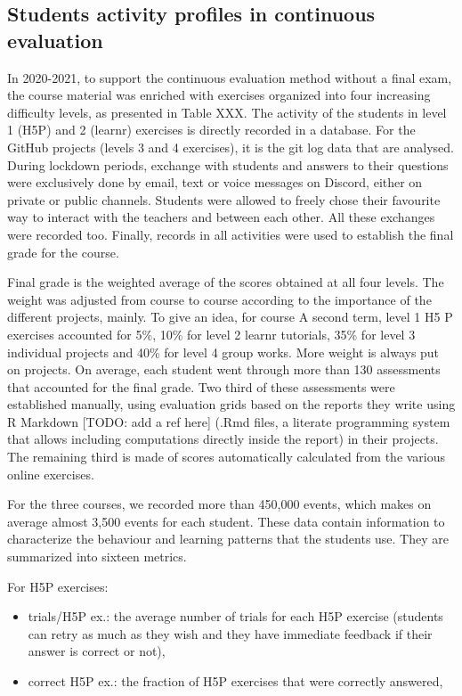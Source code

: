\documentclass[
]{article}
\providecommand{\tightlist}{%
  \setlength{\itemsep}{0pt}\setlength{\parskip}{0pt}}
\begin{document}
\hypertarget{students-activity-profiles-in-continuous-evaluation}{%
\subsection{Students activity profiles in continuous
evaluation}\label{students-activity-profiles-in-continuous-evaluation}}

In 2020-2021, to support the continuous evaluation method without a
final exam, the course material was enriched with exercises organized
into four increasing difficulty levels, as presented in Table XXX. The
activity of the students in level 1 (H5P) and 2 (learnr) exercises is
directly recorded in a database. For the GitHub projects (levels 3 and 4
exercises), it is the git log data that are analysed. During lockdown
periods, exchange with students and answers to their questions were
exclusively done by email, text or voice messages on Discord, either on
private or public channels. Students were allowed to freely chose their
favourite way to interact with the teachers and between each other. All
these exchanges were recorded too. Finally, records in all activities
were used to establish the final grade for the course.

Final grade is the weighted average of the scores obtained at all four
levels. The weight was adjusted from course to course according to the
importance of the different projects, mainly. To give an idea, for
course A second term, level 1 H5 P exercises accounted for 5\%, 10\% for
level 2 learnr tutorials, 35\% for level 3 individual projects and 40\%
for level 4 group works. More weight is always put on projects. On
average, each student went through more than 130 assessments that
accounted for the final grade. Two third of these assessments were
established manually, using evaluation grids based on the reports they
write using R Markdown {[}TODO: add a ref here{]} (.Rmd files, a
literate programming system that allows including computations directly
inside the report) in their projects. The remaining third is made of
scores automatically calculated from the various online exercises.

For the three courses, we recorded more than 450,000 events, which makes
on average almost 3,500 events for each student. These data contain
information to characterize the behaviour and learning patterns that the
students use. They are summarized into sixteen metrics.

For H5P exercises:

\begin{itemize}
\tightlist
\item
  trials/H5P ex.: the average number of trials for each H5P exercise
  (students can retry as much as they wish and they have immediate
  feedback if their answer is correct or not),
\item
  correct H5P ex.: the fraction of H5P exercises that were correctly
  answered,
\end{itemize}
\end{document}
